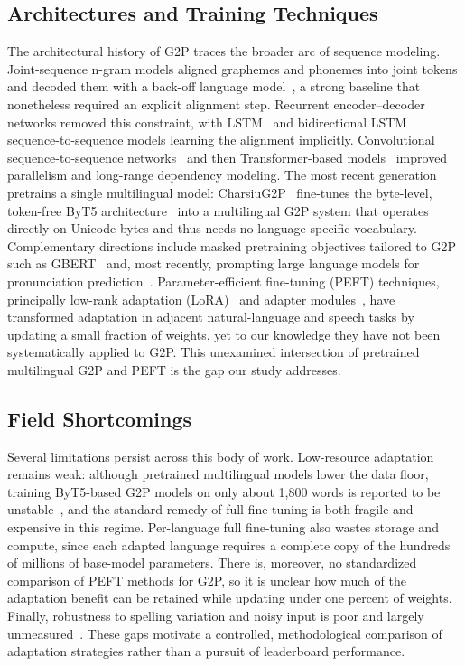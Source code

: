 \documentclass[conference]{IEEEtran}
\begin{document}
\subsection{Architectures and Training Techniques}
The architectural history of G2P traces the broader arc of sequence modeling. Joint-sequence n-gram models aligned graphemes and phonemes into joint tokens and decoded them with a back-off language model~\cite{bisani2008}, a strong baseline that nonetheless required an explicit alignment step. Recurrent encoder--decoder networks removed this constraint, with LSTM~\cite{rao2015} and bidirectional LSTM~\cite{yao2015} sequence-to-sequence models learning the alignment implicitly. Convolutional sequence-to-sequence networks~\cite{yolchuyeva2019} and then Transformer-based models~\cite{yolchuyeva2020,vaswani2017} improved parallelism and long-range dependency modeling. The most recent generation pretrains a single multilingual model: CharsiuG2P~\cite{zhu2022} fine-tunes the byte-level, token-free ByT5 architecture~\cite{xue2022byt5} into a multilingual G2P system that operates directly on Unicode bytes and thus needs no language-specific vocabulary. Complementary directions include masked pretraining objectives tailored to G2P such as GBERT~\cite{dong2022} and, most recently, prompting large language models for pronunciation prediction~\cite{fetrat2024}. Parameter-efficient fine-tuning (PEFT) techniques, principally low-rank adaptation (LoRA)~\cite{hu2021} and adapter modules~\cite{houlsby2019}, have transformed adaptation in adjacent natural-language and speech tasks by updating a small fraction of weights, yet to our knowledge they have not been systematically applied to G2P. This unexamined intersection of pretrained multilingual G2P and PEFT is the gap our study addresses.

\subsection{Field Shortcomings}
Several limitations persist across this body of work. Low-resource adaptation remains weak: although pretrained multilingual models lower the data floor, training ByT5-based G2P models on only about 1{,}800 words is reported to be unstable~\cite{zhu2022}, and the standard remedy of full fine-tuning is both fragile and expensive in this regime. Per-language full fine-tuning also wastes storage and compute, since each adapted language requires a complete copy of the hundreds of millions of base-model parameters. There is, moreover, no standardized comparison of PEFT methods for G2P, so it is unclear how much of the adaptation benefit can be retained while updating under one percent of weights. Finally, robustness to spelling variation and noisy input is poor and largely unmeasured~\cite{zhao2022}. These gaps motivate a controlled, methodological comparison of adaptation strategies rather than a pursuit of leaderboard performance.
\end{document}
